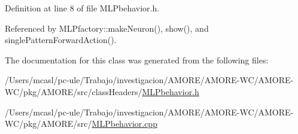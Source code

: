 Definition at line 8 of file MLPbehavior.h.



Referenced by MLPfactory::makeNeuron(), show(), and singlePatternForwardAction().



The documentation for this class was generated from the following files:\begin{DoxyCompactItemize}
\item 
/Users/mcasl/pc-\/ule/Trabajo/investigacion/AMORE/AMORE-\/WC/AMORE-\/WC/pkg/AMORE/src/classHeaders/\hyperlink{_m_l_pbehavior_8h}{MLPbehavior.h}\item 
/Users/mcasl/pc-\/ule/Trabajo/investigacion/AMORE/AMORE-\/WC/AMORE-\/WC/pkg/AMORE/src/\hyperlink{_m_l_pbehavior_8cpp}{MLPbehavior.cpp}\end{DoxyCompactItemize}
